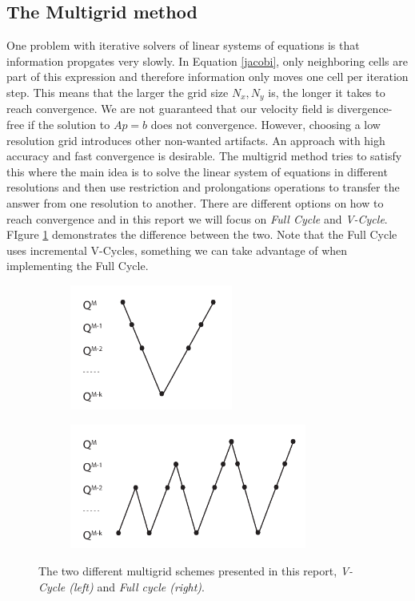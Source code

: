 \subsection{The Multigrid method}

One problem with iterative solvers of linear systems of equations is that information propgates very slowly. In Equation \ref{jacobi}, only neighboring cells are part of this expression and therefore information only moves one cell per iteration step. This means that the larger the grid size $N_x, N_y$ is, the longer it takes to reach convergence. We are not guaranteed that our velocity field is divergence-free if the solution to $Ap=b$ does not convergence. However, choosing a low resolution grid introduces other non-wanted artifacts. An approach with high accuracy and fast convergence is desirable. The multigrid method tries to satisfy this where the main idea is to solve the linear system of equations in different resolutions and then use restriction and prolongations operations to transfer the answer from one resolution to another. There are different options on how to reach convergence and in this report we will focus on \emph{Full Cycle} and \emph{V-Cycle}. FIgure \ref{multigrid} demonstrates the difference between the two. Note that the Full Cycle uses incremental V-Cycles, something we can take advantage of when implementing the Full Cycle.

\begin{figure}[ht!]
\centering
\begin{subfigure}[]{0.3\textwidth}
\includegraphics[height=41mm]{img/vcycle.pdf}
\end{subfigure}
\begin{subfigure}[]{0.3\textwidth}
\includegraphics[height=41mm]{img/fullcycle.pdf}
\end{subfigure}
\caption{The two different multigrid schemes presented in this report, \emph{V-Cycle (left)} and \emph{Full cycle (right)}.}
\label{multigrid}
\end{figure}


